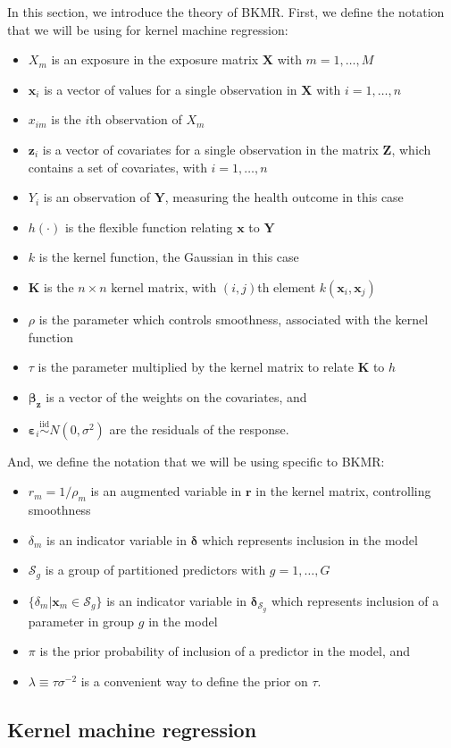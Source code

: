\documentclass[12pt, twoside]{amherstthesis}
\providecommand{\tightlist}{%
  \setlength{\itemsep}{0pt}\setlength{\parskip}{0pt}}
\begin{document}
In this section, we introduce the theory of BKMR. First, we define the notation that we will be using for kernel machine regression:
\begin{itemize}
\tightlist
\item
  \(X_m\) is an exposure in the exposure matrix \(\textbf{X}\) with \(m = 1, \dots, M\)
\item
  \(\textbf{x}_i\) is a vector of values for a single observation in \(\textbf{X}\) with \(i = 1, \dots, n\)
\item
  \(x_{im}\) is the \(i\)th observation of \(X_m\)
\item
  \(\textbf{z}_i\) is a vector of covariates for a single observation in the matrix \(\textbf{Z}\), which contains a set of covariates, with \(i = 1, \dots, n\)
\item
  \(Y_i\) is an observation of \(\textbf{Y}\), measuring the health outcome in this case
\item
  \(h(\cdot)\) is the flexible function relating \(\textbf{x}\) to \(\textbf{Y}\)
\item
  \(k\) is the kernel function, the Gaussian in this case
\item
  \(\textbf{K}\) is the \(n \times n\) kernel matrix, with \((i, j)\)th element \(k(\textbf{x}_i, \textbf{x}_j)\)
\item
  \(\rho\) is the parameter which controls smoothness, associated with the kernel function
\item
  \(\tau\) is the parameter multiplied by the kernel matrix to relate \(\textbf{K}\) to \(h\)
\item
  \(\boldsymbol{\beta}_{\textbf{z}}\) is a vector of the weights on the covariates, and
\item
  \(\boldsymbol\varepsilon_i \overset{\mathrm{iid}}{\sim} N(0, \sigma^2)\) are the residuals of the response.
\end{itemize}
And, we define the notation that we will be using specific to BKMR:
\begin{itemize}
\tightlist
\item
  \(r_m=1/\rho_m\) is an augmented variable in \(\textbf{r}\) in the kernel matrix, controlling smoothness
\item
  \(\delta_m\) is an indicator variable in \(\boldsymbol\delta\) which represents inclusion in the model
\item
  \(\mathcal{S}_g\) is a group of partitioned predictors with \({g=1,\dots,G}\)
\item
  \(\{\delta_m|\textbf{x}_m \in{\mathcal{S}_g}\}\) is an indicator variable in \(\boldsymbol\delta_{\mathcal{S}_g}\) which represents inclusion of a parameter in group \(g\) in the model
\item
  \(\pi\) is the prior probability of inclusion of a predictor in the model, and
\item
  \(\lambda \equiv \tau\sigma^{-2}\) is a convenient way to define the prior on \(\tau\).
\end{itemize}
\hypertarget{kernel-machine-regression}{%
\subsection{Kernel machine regression}\label{kernel-machine-regression}}
\end{document}
